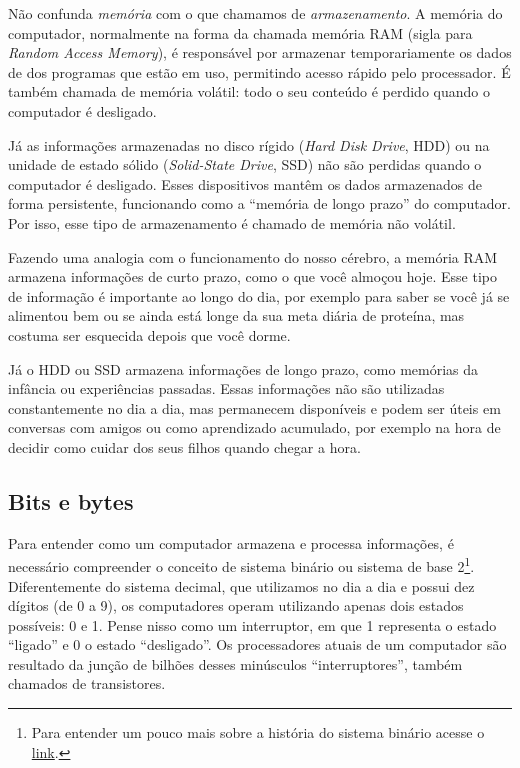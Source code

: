 \documentclass[
  brazilian,
  letterpaper,
  DIV=11,
  numbers=noendperiod]{scrreprt}
\begin{document}
\begin{tcolorbox}[enhanced jigsaw, breakable, coltitle=black, title=\textcolor{quarto-callout-important-color}{\faExclamation}\hspace{0.5em}{Importante}, titlerule=0mm, colbacktitle=quarto-callout-important-color!10!white, opacitybacktitle=0.6, arc=.35mm, bottomrule=.15mm, toptitle=1mm, opacityback=0, colback=white, bottomtitle=1mm, toprule=.15mm, rightrule=.15mm, left=2mm, colframe=quarto-callout-important-color-frame, leftrule=.75mm]

Não confunda \emph{memória} com o que chamamos de \emph{armazenamento}.
A memória do computador, normalmente na forma da chamada memória RAM
(sigla para \emph{Random Access Memory}), é responsável por armazenar
temporariamente os dados de dos programas que estão em uso, permitindo
acesso rápido pelo processador. É também chamada de memória volátil:
todo o seu conteúdo é perdido quando o computador é desligado.

Já as informações armazenadas no disco rígido (\emph{Hard Disk Drive},
HDD) ou na unidade de estado sólido (\emph{Solid-State Drive}, SSD) não
são perdidas quando o computador é desligado. Esses dispositivos mantêm
os dados armazenados de forma persistente, funcionando como a ``memória
de longo prazo'' do computador. Por isso, esse tipo de armazenamento é
chamado de memória não volátil.

Fazendo uma analogia com o funcionamento do nosso cérebro, a memória RAM
armazena informações de curto prazo, como o que você almoçou hoje. Esse
tipo de informação é importante ao longo do dia, por exemplo para saber
se você já se alimentou bem ou se ainda está longe da sua meta diária de
proteína, mas costuma ser esquecida depois que você dorme.

Já o HDD ou SSD armazena informações de longo prazo, como memórias da
infância ou experiências passadas. Essas informações não são utilizadas
constantemente no dia a dia, mas permanecem disponíveis e podem ser
úteis em conversas com amigos ou como aprendizado acumulado, por exemplo
na hora de decidir como cuidar dos seus filhos quando chegar a hora.

\end{tcolorbox}

\subsection{Bits e bytes}\label{bits-e-bytes}

Para entender como um computador armazena e processa informações, é
necessário compreender o conceito de sistema binário ou sistema de base
2\footnote{Para entender um pouco mais sobre a história do sistema
  binário acesse o
  \href{https://imasters.com.br/tecnologia/a-historia-do-codigo-binario-a-base-da-computacao-moderna}{link}.}.
Diferentemente do sistema decimal, que utilizamos no dia a dia e possui
dez dígitos (de 0 a 9), os computadores operam utilizando apenas dois
estados possíveis: 0 e 1. Pense nisso como um interruptor, em que 1
representa o estado ``ligado'' e 0 o estado ``desligado''. Os
processadores atuais de um computador são resultado da junção de bilhões
desses minúsculos ``interruptores'', também chamados de transistores.
\end{document}
